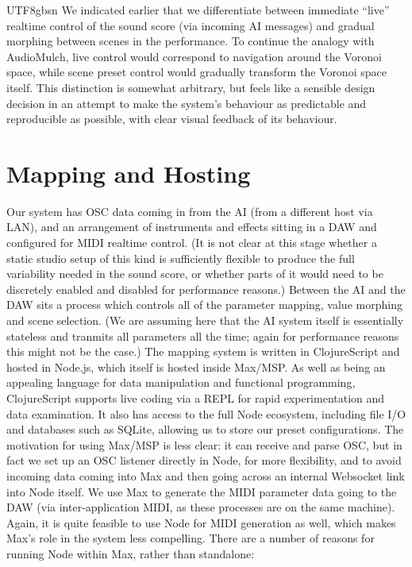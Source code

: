 \documentclass[manuscript,review,anonymous,natbib=false]{acmart}
\begin{document}
\begin{CJK*}{UTF8}{gbsn}
  We indicated earlier that we differentiate between immediate ``live'' realtime control of the sound score (via incoming AI messages) and gradual morphing between scenes in the performance. To continue the analogy with AudioMulch, live control would correspond to navigation around the Voronoi space, while scene preset control would gradually transform the Voronoi space itself. This distinction is somewhat arbitrary, but feels like a sensible design decision in an attempt to make the system's behaviour as predictable and reproducible as possible, with clear visual feedback of its behaviour.

  \section{Mapping and Hosting}

  Our system has OSC data coming in from the AI (from a different host via LAN), and an arrangement of instruments and effects sitting in a DAW and configured for MIDI realtime control. (It is not clear at this stage whether a static studio setup of this kind is sufficiently flexible to produce the full variability needed in the sound score, or whether parts of it would need to be discretely enabled and disabled for performance reasons.) Between the AI and the DAW sits a process which controls all of the parameter mapping, value morphing and scene selection. (We are assuming here that the AI system itself is essentially stateless and tranmits all parameters all the time; again for performance reasons this might not be the case.) The mapping system is written in ClojureScript and hosted in Node.js, which itself is hosted inside Max/MSP. As well as being an appealing language for data manipulation and functional programming, ClojureScript supports live coding via a REPL for rapid experimentation and data examination. It also has access to the full Node ecosystem, including file I/O and databases such as SQLite, allowing us to store our preset configurations. The motivation for using Max/MSP is less clear: it can receive and parse OSC, but in fact we set up an OSC listener directly in Node, for more flexibility, and to avoid incoming data coming into Max and then going across an internal Websocket link into Node itself. We use Max to generate the MIDI parameter data going to the DAW (via inter-application MIDI, as these processes are on the same machine). Again, it is quite feasible to use Node for MIDI generation as well, which makes Max's role in the system less compelling. There are a number of reasons for running Node within Max, rather than standalone:


\end{CJK*}
\end{document}
